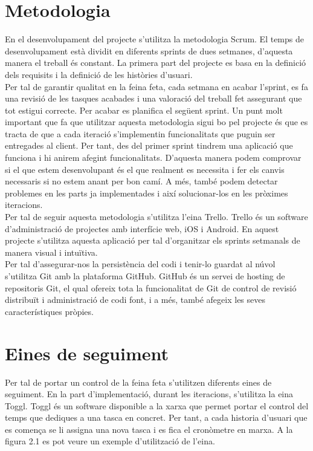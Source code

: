 \section{Metodologia}

En el desenvolupament del projecte s’utilitza la metodologia Scrum. El temps de desenvolupament està dividit en diferents sprints de dues setmanes, d’aquesta manera el treball és constant. La primera part del projecte es basa en la definició dels requisits i la definició de les històries d’usuari.\\

Per tal de garantir qualitat en la feina feta, cada setmana en acabar l’sprint, es fa una revisió de les tasques acabades i una valoració del treball fet assegurant que tot estigui correcte. Per acabar es planifica el següent sprint. Un punt molt important que fa que utilitzar aquesta metodologia sigui bo pel projecte és que es tracta de que a cada iteració s’implementin funcionalitats que puguin ser entregades al client. Per
tant, des del primer sprint tindrem una aplicació que funciona i hi anirem afegint funcionalitats. D’aquesta manera podem comprovar si el que estem desenvolupant és el que realment es necessita i fer els canvis necessaris si no estem anant per bon camí. A més, també podem detectar problemes en les parts ja implementades i així solucionar-los en les pròximes iteracions.\\

Per tal de seguir aquesta metodologia s’utilitza l’eina Trello. Trello és un software d’administració de projectes amb interfície web, iOS i Android. En aquest projecte s’utilitza aquesta aplicació per tal d’organitzar els sprints setmanals de manera visual i intuïtiva.\\

Per tal d’assegurar-nos la persistència del codi i tenir-lo guardat al núvol s’utilitza Git amb la plataforma GitHub. GitHub és un servei de hosting de repositoris Git, el qual ofereix tota la funcionalitat de Git de control de revisió distribuït i administració de codi font, i a més, també afegeix les seves característiques pròpies.


\section{Eines de seguiment}

Per tal de portar un control de la feina feta s’utilitzen diferents eines de seguiment. En la part d’implementació, durant les iteracions, s’utilitza la eina Toggl. Toggl és un software disponible a la xarxa que permet portar el control del temps que dediques a una tasca en concret. Per tant, a cada historia d’usuari que es comença se li assigna una nova tasca i es fica el cronòmetre en marxa. A la figura 2.1 es pot veure
un exemple d’utilització de l’eina.\\

